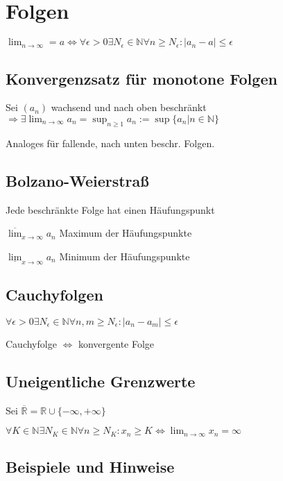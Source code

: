 \section*{Folgen}

$\displaystyle\lim_{n \to \infty} = a \Leftrightarrow \forall \epsilon > 0 \exists N_\epsilon \in \mathbb{N} \forall n \geq N_\epsilon : | a_n - a | \leq \epsilon$

\subsection*{Konvergenzsatz für monotone Folgen}

Sei $(a_n)$ wachsend und nach oben beschränkt \\ $\Rightarrow \exists \lim_{n \to \infty} a_n = \sup_{n\geq 1} a_n := \sup\{a_n | n \in \mathbb{N}\}$

Analoges für fallende, nach unten beschr. Folgen.

\subsection*{Bolzano-Weierstraß}

Jede beschränkte Folge hat einen Häufungspunkt

$\overline\lim_{x \to \infty} a_n$ Maximum der Häufungspunkte

$\underline\lim_{x \to \infty} a_n$ Minimum der Häufungspunkte

\subsection*{Cauchyfolgen}

$\forall \epsilon > 0 \exists N_\epsilon \in \mathbb{N} \forall n, m \geq N_\epsilon : | a_n - a_m | \leq \epsilon$

Cauchyfolge $\Leftrightarrow$ konvergente Folge

\subsection*{Uneigentliche Grenzwerte}

Sei $\overline{\mathbb{R}} = \mathbb{R} \cup \{-\infty, +\infty\}$

$\forall K \in \mathbb{N} \exists N_K \in \mathbb{N} \forall n \geq N_K : x_n \geq K \Leftrightarrow \displaystyle\lim_{n \to \infty} x_n = \infty$

\subsection*{Beispiele und Hinweise}

